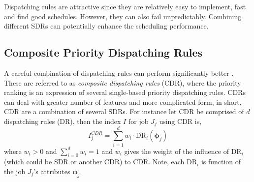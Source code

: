\documentclass[smallextended]{svjour3}
\renewcommand{\vphi}{\bm \phi}
\begin{document}
Dispatching rules are attractive since they are relatively easy to implement, 
fast and find good schedules. However, they can also fail unpredictably. 
Combining different SDRs can potentially enhance the scheduling performance. 

\subsection{Composite Priority Dispatching Rules}\label{sec:CDR}
A careful combination of dispatching rules can perform significantly better 
\cite{Jayamohan04}. These are referred to as \emph{composite dispatching rules} 
(CDR), where the priority ranking is an expression of several single-based 
priority dispatching rules. CDRs can deal with greater number of features and 
more complicated form, in short, CDR are a combination of several SDRs. For 
instance let CDR be comprised of $d$ dispatching rules (DR), then the index $I$ 
for job $J_j$ using CDR is, 
\begin{equation}
	I_j^{CDR} = \sum_{i=1}^d w_i \cdot \text{DR}_i(\vphi_j) \label{eq:CDR}
\end{equation}
where $w_i>0$ and $\sum_{i=0}^d w_i = 1$ and $w_i$ gives the weight of the 
influence of $\text{DR}_i$ (which could be SDR or another CDR) to CDR. Note, 
each $\text{DR}_i$ is function of the job $J_j$'s attributes $\vphi_j$.  


\end{document}
